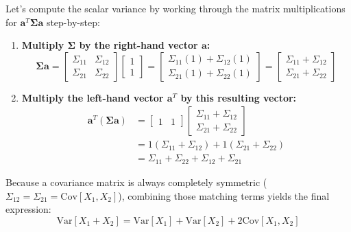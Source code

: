 \documentclass{article}
\begin{document}
Let's compute the scalar variance by working through the matrix multiplications for $\mathbf{a}^T\boldsymbol{\Sigma}\mathbf{a}$ step-by-step:
\begin{enumerate}
    \item \textbf{Multiply $\boldsymbol{\Sigma}$ by the right-hand vector $\mathbf{a}$:}
    \begin{equation*}
    \boldsymbol{\Sigma}\mathbf{a} = 
    \begin{bmatrix} 
    \Sigma_{11} & \Sigma_{12} \\ 
    \Sigma_{21} & \Sigma_{22} 
    \end{bmatrix}
    \begin{bmatrix} 1 \\ 1 \end{bmatrix} = 
    \begin{bmatrix} 
    \Sigma_{11}(1) + \Sigma_{12}(1) \\ 
    \Sigma_{21}(1) + \Sigma_{22}(1) 
    \end{bmatrix} = 
    \begin{bmatrix} 
    \Sigma_{11} + \Sigma_{12} \\ 
    \Sigma_{21} + \Sigma_{22} 
    \end{bmatrix}
    \end{equation*}
    \item \textbf{Multiply the left-hand vector $\mathbf{a}^T$ by this resulting vector:}
    \begin{align*}
    \mathbf{a}^T(\boldsymbol{\Sigma}\mathbf{a}) &= 
    \begin{bmatrix} 1 & 1 \end{bmatrix} 
    \begin{bmatrix} \Sigma_{11} + \Sigma_{12} \\ \Sigma_{21} + \Sigma_{22} \end{bmatrix} \\
    &= 1(\Sigma_{11} + \Sigma_{12}) + 1(\Sigma_{21} + \Sigma_{22}) \\
    &= \Sigma_{11} + \Sigma_{22} + \Sigma_{12} + \Sigma_{21}
    \end{align*}
\end{enumerate}

Because a covariance matrix is always completely symmetric ($\Sigma_{12} = \Sigma_{21} = \text{Cov}[X_1, X_2]$), combining those matching terms yields the final expression:
\begin{equation}
\text{Var}[X_1 + X_2] = \text{Var}[X_1] + \text{Var}[X_2] + 2\text{Cov}[X_1, X_2] \tag{226}
\end{equation}
\end{document}
